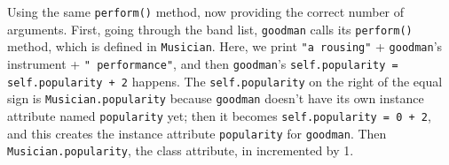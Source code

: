 \begin{blocksection}
\begin{solution}[.2in]
Using the same \lstinline{perform()} method, now providing the correct number of arguments. First, going through the band list, \lstinline{goodman} calls its \lstinline{perform()} method, which is defined in \lstinline{Musician}. Here, we print \lstinline{"a rousing"} + \lstinline{goodman}'s instrument + \lstinline{" performance"}, and then \lstinline{goodman}'s \lstinline{self.popularity = self.popularity + 2} happens. The \lstinline{self.popularity} on the right of the equal sign is \lstinline{Musician.popularity} because \lstinline{goodman} doesn't have its own instance attribute named \lstinline{popularity} yet; then it becomes \lstinline{self.popularity = 0 + 2}, and this creates the instance attribute \lstinline{popularity} for \lstinline{goodman}. Then \lstinline{Musician.popularity}, the class attribute, in incremented by 1.
\end{solution}
\end{blocksection}

\vspace{2\baselineskip}

